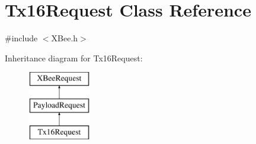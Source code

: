 \hypertarget{classTx16Request}{\section{\-Tx16\-Request \-Class \-Reference}
\label{classTx16Request}
}


{\ttfamily \#include $<$\-X\-Bee.\-h$>$}

\-Inheritance diagram for \-Tx16\-Request\-:\begin{figure}[H]
\begin{center}
\leavevmode
\includegraphics[height=3.000000cm]{classTx16Request}
\end{center}
\end{figure}
